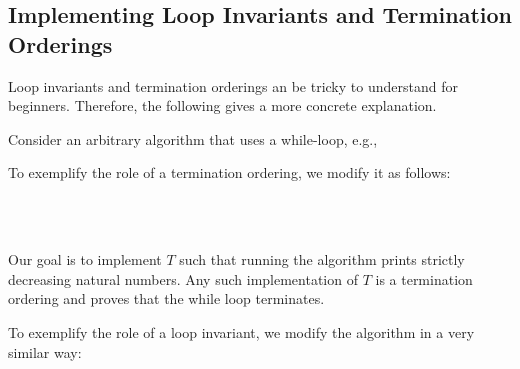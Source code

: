 \subsection{Implementing Loop Invariants and Termination Orderings}

Loop invariants and termination orderings an be tricky to understand for beginners.
Therefore, the following gives a more concrete explanation.

Consider an arbitrary algorithm that uses a while-loop, e.g.,
\begin{acode}
\end{acode}

To exemplify the role of a termination ordering, we modify it as follows:
\begin{acode}
\\
\\
\end{acode}

Our goal is to implement $T$ such that running the algorithm prints strictly decreasing natural numbers.
Any such implementation of $T$ is a termination ordering and proves that the while loop terminates.
\medskip

To exemplify the role of a loop invariant, we modify the algorithm in a very similar way:
\begin{acode}
\\
\\
\end{acode}

